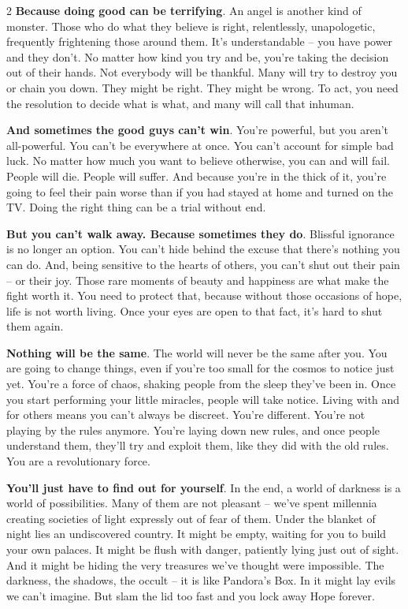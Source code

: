 \begin{multicols}{2}
\textbf{Because doing good can be terrifying}. An angel is another kind of monster. Those who do what they believe is right, relentlessly, unapologetic, frequently frightening those around them. It's understandable -- you have power and they don't. No matter how kind you try and be, you're taking the decision out of their hands. Not everybody will be thankful. Many will try to destroy you or chain you down. They might be right. They might be wrong. To act, you need the resolution to decide what is what, and many will call that inhuman.

\textbf{And sometimes the good guys can't win}. You're powerful, but you aren't all-powerful. You can't be everywhere at once. You can't account for simple bad luck. No matter how much you want to believe otherwise, you can and will fail. People will die. People will suffer. And because you're in the thick of it, you're going to feel their pain worse than if you had stayed at home and turned on the TV. Doing the right thing can be a trial without end.

\textbf{But you can't walk away. Because sometimes they do}. Blissful ignorance is no longer an option. You can't hide behind the excuse that there's nothing you can do. And, being sensitive to the hearts of others, you can't shut out their pain -- or their joy. Those rare moments of beauty and happiness are what make the fight worth it. You need to protect that, because without those occasions of hope, life is not worth living. Once your eyes are open to that fact, it's hard to shut them again.

\textbf{Nothing will be the same}. The world will never be the same after you. You are going to change things, even if you're too small for the cosmos to notice just yet. You're a force of chaos, shaking people from the sleep they've been in. Once you start performing your little miracles, people will take notice. Living with and for others means you can't always be discreet. You're different. You're not playing by the rules anymore. You're laying down new rules, and once people understand them, they'll try and exploit them, like they did with the old rules. You are a revolutionary force.

\textbf{You'll just have to find out for yourself}. In the end, a world of darkness is a world of possibilities. Many of them are not pleasant -- we've spent millennia creating societies of light expressly out of fear of them. Under the blanket of night lies an undiscovered country. It might be empty, waiting for you to build your own palaces. It might be flush with danger, patiently lying just out of sight. And it might be hiding the very treasures we've thought were impossible. The darkness, the shadows, the occult -- it is like Pandora's Box. In it might lay evils we can't imagine. But slam the lid too fast and you lock away Hope forever.


\end{multicols}
